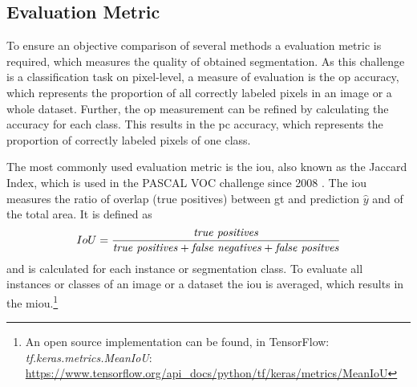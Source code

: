 \subsection{Evaluation Metric}\label{ord:ch2:sec2:subsec_metric}
To ensure an objective comparison of several methods a evaluation metric is required, which measures the quality of obtained segmentation.
As this challenge is a classification task on pixel-level, a measure of evaluation is the \gls{op} accuracy, which represents the proportion of all correctly labeled pixels in an image or a whole dataset.
Further, the \gls{op} measurement can be refined by calculating the accuracy for each class.
This results in the \gls{pc} accuracy, which represents the proportion of correctly labeled pixels of one class.

The most commonly used evaluation metric is the \gls{iou}, also known as the Jaccard Index, which is used in the PASCAL VOC challenge \cite{Eve20-PascalVOC} since 2008 \cite{Csu13-EvalMetric}. 
The \gls{iou} measures the ratio of overlap (true positives) between \gls{gt} and prediction $\hat{y}$ and of the total area. 
It is defined as
\begin{equation} \label{equ:iou}
	\centering
	IoU = \frac{\textnormal{\textit{true positives}}}{\textnormal{\textit{true positives}} + \textnormal{\textit{false negatives}} + \textnormal{\textit{false positves}}}
\end{equation}
and is calculated for each instance or segmentation class.
To evaluate all instances or classes of an image or a dataset the \gls{iou} is averaged, which results in the \gls{miou}.\footnote{An open source implementation can be found, \eg in TensorFlow: \textit{tf.keras.metrics.MeanIoU}: \url{https://www.tensorflow.org/api_docs/python/tf/keras/metrics/MeanIoU}}

